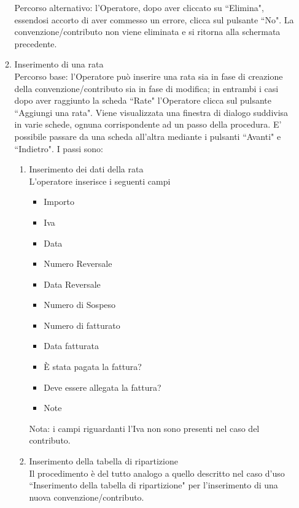 \begin{enumerate}
\begin{enumerate}
  Percorso alternativo:
  l'Operatore, dopo aver cliccato su ``Elimina", essendosi accorto di aver commesso un errore, clicca sul pulsante ``No". La convenzione/contributo non viene eliminata e si ritorna alla schermata precedente.
  
  
  
\item Inserimento di una rata\\ \label{UC_new_installment}
Percorso base:
l'Operatore può inserire una rata sia in fase di creazione della convenzione/contributo sia in fase di modifica; in entrambi i casi dopo aver raggiunto
la scheda ``Rate" l'Operatore clicca sul pulsante ``Aggiungi una rata".  
Viene visualizzata una finestra di dialogo suddivisa in varie schede,
ognuna corrispondente ad un passo della procedura. E' possibile passare da una scheda all'altra mediante i pulsanti \textquotedblleft Avanti" e \textquotedblleft Indietro". I passi sono:
\begin{enumerate}
  \item Inserimento dei dati della rata\\
  
  L'operatore inserisce i seguenti campi
    \begin{itemize}
    \item Importo
    \item Iva
    \item Data
    \item Numero Reversale
    \item Data Reversale
    \item Numero di Sospeso
    \item Numero di fatturato
    \item Data fatturata
    \item È stata pagata la fattura?
    \item Deve essere allegata la fattura?
    \item Note
    \end{itemize}
    
   Nota: i campi riguardanti l'Iva non sono presenti nel caso del contributo.

   
  \item Inserimento della tabella di ripartizione\\
  
  Il procedimento è del tutto analogo a quello descritto nel caso d'uso \textquotedblleft Inserimento della tabella di ripartizione" per l'inserimento di 
  una nuova convenzione/contributo. 
\end{enumerate}


\end{enumerate}
\end{enumerate}
